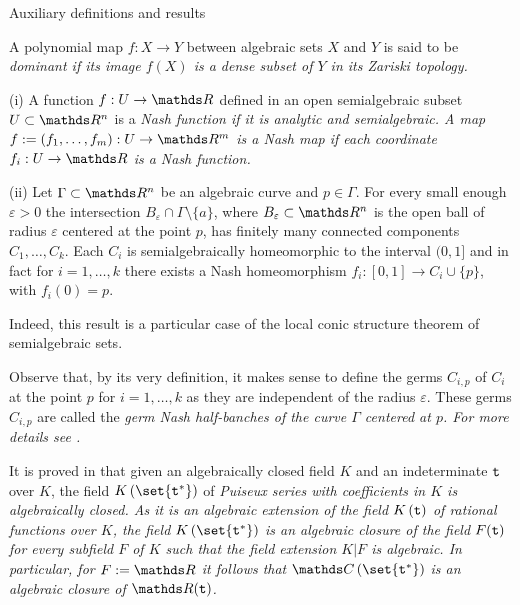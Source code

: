 \documentclass[11pt, a4paper, english, twoside, notitlepage, openright]{report}
\begin{document}
\begin{chapter}{Auxiliary definitions and results}
\begin{definition}\label{dominant}
	A polynomial map $f:X\to Y$ between algebraic sets $X$ and $Y$ is said to be \em dominant \em if its image $f(X)$ is a dense subset of $Y$ in its Zariski topology. 
\end{definition}

\begin{definitions}\label{curveGerms}
	(i) A function $f:U\to\R$ defined in an open semialgebraic subset $U\subset\R^n$ is a \em Nash function \em if it is analytic and semialgebraic. A map $f:=(f_1,\dots,f_m):U\to\R^m$ is a \em Nash map \em if each coordinate $f_i:U\to\R$ is a Nash function. 
	
	(ii) Let $\Gamma\subset\R^n$ be an algebraic curve and $p\in\Gamma$. For every small enough $\varepsilon>0$ the intersection $B_{\varepsilon}\cap\Gamma\setminus\{a\}$, %
where $B_{\varepsilon}\subset\R^n$ is the open ball of radius $\varepsilon$ centered at the point $p$, has finitely many connected components $C_1,\dots,C_k$. Each $C_i$ is semialgebraically homeomorphic to the interval $(0,1]$ and in fact for $i=1,\dots,k$ there exists a Nash homeomorphism  $f_i:[0,1]\to C_i\cup\{p\}$, with $f_i(0)=p$.

Indeed, this result is a particular case of the local conic structure theorem of semialgebraic sets. 
	
Observe that, by its very definition, it makes sense to define the germs $C_{i,p}$ of $C_i$ at the point $p$ for $i=1,\dots,k$ as they are independent of the radius $\varepsilon$. These germs  $C_{i,p}$ are called the \em germ Nash half-banches \em of the curve $\Gamma$ centered at $p$. For more details see \cite[IX.5.2]{bcr}. 
\end{definitions}

\begin{definition} \label{puiseux} It is proved in \cite[pp. 98-102]{w} that given an algebraically closed field $K$ and an indeterminate ${\tt t}$ over $K$, the field $K\left(\set{{\tt t}^*}\right)$ of \em Puiseux series \em with coefficients in $K$ is algebraically closed. As it is an algebraic extension of the field $K\left({\tt t}\right)$ of rational functions over $K$, the field $K\left(\set{{\tt t}^*}\right)$ is an algebraic closure of the field $F({\tt t})$ for every subfield $F$ of $K$ such that the field extension $K|F$ is algebraic. In particular, for $F:=\R$ it follows that $\C\left(\set{{\tt t}^*}\right)$ is an algebraic closure of $\R({\tt t})$.
\end{definition}


\end{chapter}
\end{document}
